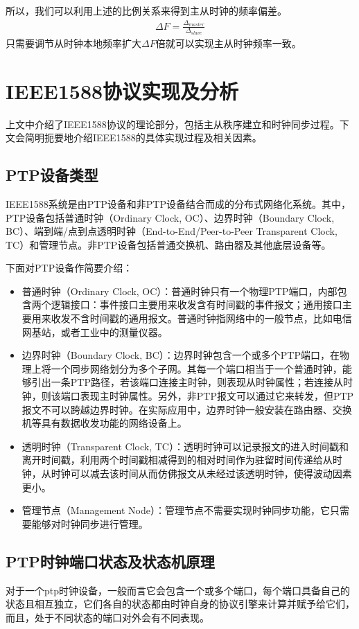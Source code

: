 所以，我们可以利用上述的比例关系来得到主从时钟的频率偏差。
\begin{align}
	\Delta F = \frac{\Delta _{master}}{\Delta _{slave}}
\end{align}
只需要调节从时钟本地频率扩大$\Delta F$倍就可以实现主从时钟频率一致。

\section{IEEE1588协议实现及分析}
上文中介绍了IEEE1588协议的理论部分，包括主从秩序建立和时钟同步过程。下文会简明扼要地介绍IEEE1588的具体实现过程及相关因素。

\subsection{PTP设备类型}
IEEE1588系统是由PTP设备和非PTP设备结合而成的分布式网络化系统。其中，PTP设备包括普通时钟（Ordinary Clock, OC）、边界时钟（Boundary Clock, BC）、端到端/点到点透明时钟（End-to-End/Peer-to-Peer Transparent Clock, TC）和管理节点。非PTP设备包括普通交换机、路由器及其他底层设备等。

下面对PTP设备作简要介绍：
\begin{itemize}[noitemsep,topsep=0pt,parsep=0pt,partopsep=0pt]
	\item 普通时钟（Ordinary Clock, OC）：普通时钟只有一个物理PTP端口，内部包含两个逻辑接口：事件接口主要用来收发含有时间戳的事件报文；通用接口主要用来收发不含时间戳的通用报文。普通时钟指网络中的一般节点，比如电信网基站，或者工业中的测量仪器。
	\item 边界时钟（Boundary Clock, BC）：边界时钟包含一个或多个PTP端口，在物理上将一个同步网络划分为多个子网。其每一个端口相当于一个普通时钟，能够引出一条PTP路径，若该端口连接主时钟，则表现从时钟属性；若连接从时钟，则该端口表现主时钟属性。另外，非PTP报文可以通过它来转发，但PTP报文不可以跨越边界时钟。在实际应用中，边界时钟一般安装在路由器、交换机等具有数据收发功能的网络设备上。
	\item 透明时钟（Transparent Clock, TC）：透明时钟可以记录报文的进入时间戳和离开时间戳，利用两个时间戳相减得到的相对时间作为驻留时间传递给从时钟，从时钟可以减去该时间从而仿佛报文从未经过该透明时钟，使得波动因素更小。
	\item 管理节点（Management Node）：管理节点不需要实现时钟同步功能，它只需要能够对时钟同步进行管理。
\end{itemize}

\subsection{PTP时钟端口状态及状态机原理}
对于一个ptp时钟设备，一般而言它会包含一个或多个端口，每个端口具备自己的状态且相互独立，它们各自的状态都由时钟自身的协议引擎来计算并赋予给它们，而且，处于不同状态的端口对外会有不同表现。

